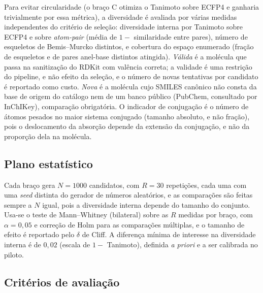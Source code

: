 Para evitar circularidade (o braço C otimiza o Tanimoto sobre ECFP4 e ganharia trivialmente por essa métrica), a diversidade é avaliada por várias medidas independentes do critério de seleção: diversidade interna por Tanimoto sobre ECFP4 e sobre \textit{atom-pair} (média de $1-$ similaridade entre pares), número de esqueletos de Bemis--Murcko distintos, e cobertura do espaço enumerado (fração de esqueletos e de pares anel-base distintos atingida). \emph{Válida} é a molécula que passa na sanitização do RDKit com valência correta; a validade é uma restrição do pipeline, e não efeito da seleção, e o número de novas tentativas por candidato é reportado como custo. \emph{Nova} é a molécula cujo SMILES canônico não consta da base de origem do catálogo nem de um banco público (PubChem, consultado por InChIKey), comparação obrigatória. O indicador de conjugação é o número de átomos pesados no maior sistema conjugado (tamanho absoluto, e não fração), pois o deslocamento da absorção depende da extensão da conjugação, e não da proporção dela na molécula.

\subsection{Plano estatístico}

Cada braço gera $N=1000$ candidatos, com $R=30$ repetições, cada uma com uma \textit{seed} distinta do gerador de números aleatórios, e as comparações são feitas sempre a $N$ igual, pois a diversidade interna depende do tamanho do conjunto. Usa-se o teste de Mann--Whitney (bilateral) sobre as $R$ medidas por braço, com $\alpha=0{,}05$ e correção de Holm para as comparações múltiplas, e o tamanho de efeito é reportado pelo $\delta$ de Cliff. A diferença mínima de interesse na diversidade interna é de $0{,}02$ (escala de $1-$ Tanimoto), definida \textit{a priori} e a ser calibrada no piloto.

\subsection{Critérios de avaliação}

